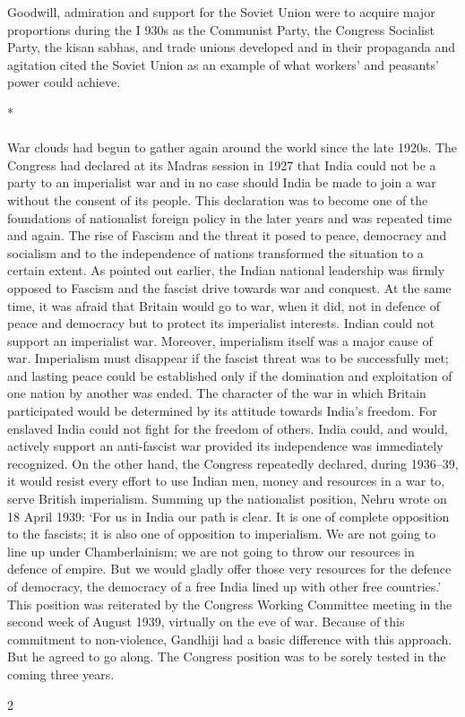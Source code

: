 \begin{multicols}{2}
Goodwill, admiration and support for the Soviet Union were to acquire major proportions during the I 930s as the Communist Party, the Congress Socialist Party, the kisan sabhas, and trade unions developed and in their propaganda and agitation cited the Soviet Union as an example of what workers' and peasants' power could achieve.

\begin{center}*\end{center}

\paragraph*{}

War clouds had begun to gather again around the world since the late 1920s. The Congress had declared at its Madras session in 1927 that India could not be a party to an imperialist war and in no case should India be made to join a war without the consent of its people. This declaration was to become one of the foundations of nationalist foreign policy in the later years and was repeated time and again. The rise of Fascism and the threat it posed to peace, democracy and socialism and to the independence of nations transformed the situation to a certain extent. As pointed out earlier, the Indian national leadership was firmly opposed to Fascism and the fascist drive towards war and conquest. At the same time, it was afraid that Britain would go to war, when it did, not in defence of peace and democracy but to protect its imperialist interests. Indian could not support an imperialist war. Moreover, imperialism itself was a major cause of war. Imperialism must disappear if the fascist threat was to be successfully met; and lasting peace could be established only if the domination and exploitation of one nation by another was ended. The character of the war in which Britain participated would be determined by its attitude towards India's freedom. For enslaved India could not fight for the freedom of others. India could, and would, actively support an anti-fascist war provided its independence was immediately recognized. On the other hand, the Congress repeatedly declared, during 1936--39, it would resist every effort to use Indian men, money and resources in a war to, serve British imperialism. Summing up the nationalist position, Nehru wrote on 18 April 1939: `For us in India our path is clear. It is one of complete opposition to the fascists; it is also one of opposition to imperialism. We are not going to line up under Chamberlainism; we are not going to throw our resources in defence of empire. But we would gladly offer those very resources for the defence of democracy, the democracy of a free India lined up with other free countries.' This position was reiterated by the Congress Working Committee meeting in the second week of August 1939, virtually on the eve of war. Because of this commitment to non-violence, Gandhiji had a basic difference with this approach. But he agreed to go along. The Congress position was to be sorely tested in the coming three years.
\end{multicols}{2}
